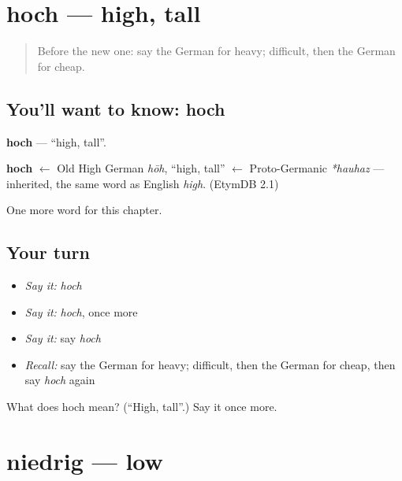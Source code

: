 \section[hoch]{hoch — high, tall}

\label{lesson:GE-C90-hoch}



\begin{quote}
Before the new one: say the German for heavy; difficult, then the German for cheap.
\end{quote}

\subsection*{You'll want to know: hoch}
\textbf{hoch} — \textquotedblleft{}high, tall\textquotedblright{}.

\begin{cousinweb}
\textbf{hoch} $\leftarrow$ Old High German \emph{hōh}, \textquotedblleft{}high, tall\textquotedblright{} $\leftarrow$ Proto-Germanic \emph{*hauhaz} — inherited, the same word as English \emph{high}. (EtymDB 2.1)
\end{cousinweb}

\begin{grammarlens}[title={What you've built}]
One more word for this chapter.
\end{grammarlens}

\subsection*{Your turn}
\begin{itemize}
\raggedright
  \item \emph{Say it:} \emph{hoch}
  \item \emph{Say it:} \emph{hoch}, once more
  \item \emph{Say it:} say \emph{hoch}
  \item \emph{Recall:} say the German for heavy; difficult, then the German for cheap, then say \emph{hoch} again
\end{itemize}

\begin{tcolorbox}[breakable,colback=teal!4,colframe=teal!35!black,title={Before you move on}]
What does hoch mean? (\textquotedblleft{}High, tall\textquotedblright{}.) Say it once more.
\end{tcolorbox}
\section[niedrig]{niedrig — low}

